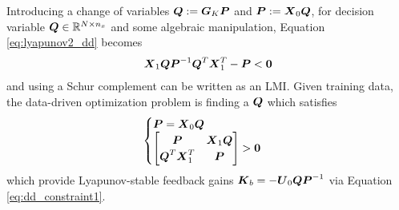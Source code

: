 Introducing a change of variables $\vb*{Q} := \vb*{G}_{K}\vb*{P}$ and $\vb*{P} := \vb*{X}_{0}\vb*{Q}$, for decision variable $\vb*{Q} \in \mathbb{R}^{N \times n_{x}}$ and some algebraic manipulation, Equation \eqref{eq:lyapunov2_dd} becomes
\begin{equation}
\label{eq:lyapunov3_dd}
\begin{aligned}
	\vb*{X}_{1}\vb*{Q} \vb*{P}^{-1} \vb*{Q}^{T}\vb*{X}_{1}^{T} - \vb*{P} < \vb*{0}
\end{aligned}
\end{equation}
and using a Schur complement can be written as an LMI.  Given training data, the data-driven optimization problem is finding a $\vb*{Q}$ which satisfies
\begin{equation}
\label{eq:lyapunov_lmi}
\begin{aligned}
	\begin{cases}
		\vb*{P} = \vb*{X}_{0}\vb*{Q}\\ \vspace{-15pt}\\
		\begin{bmatrix}
			\vb*{P} & \vb*{X}_{1} \vb*{Q}\\
			\vb*{Q}^{T}\vb*{X}_{1}^{T} & \vb*{P}\\
		\end{bmatrix} > \vb*{0}
	\end{cases}
\end{aligned}
\end{equation}
which provide Lyapunov-stable feedback gains $\vb*{K}_{b} = -\vb*{U}_{0}\vb*{Q}\vb*{P}^{-1}$ via Equation \eqref{eq:dd_constraint1}.

